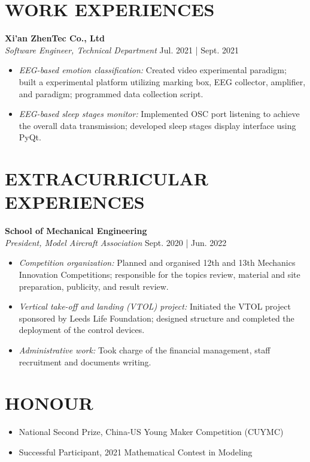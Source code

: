 \documentclass[a4paper,9pt]{extarticle}
\begin{document}
\section*{WORK EXPERIENCES}
\noindent
\textbf{Xi'an ZhenTec Co., Ltd} \\ %
\textit{Software Engineer, Technical Department} \hfill Jul. 2021 | Sept. 2021 %
\begin{itemize}
    \item \textit{EEG-based emotion classification:} Created video experimental paradigm; built a experimental platform utilizing marking box, EEG collector, amplifier, and paradigm; programmed data collection script.
    \item \textit{EEG-based sleep stages monitor:} Implemented OSC port listening to achieve the overall data transmission; developed sleep stages display interface using PyQt.
\end{itemize}

\section*{EXTRACURRICULAR EXPERIENCES}
\noindent
\textbf{School of Mechanical Engineering} \\ %
\textit{President, Model Aircraft Association} \hfill Sept. 2020 | Jun. 2022 %
\begin{itemize}
    \item \textit{Competition organization:} Planned and organised 12th and 13th Mechanics Innovation Competitions; responsible for the topics review, material and site preparation, publicity, and result review.
    \item \textit{Vertical take-off and landing (VTOL) project:} Initiated the VTOL project sponsored by Leeds Life Foundation; designed structure and completed the deployment of the control devices.
    \item \textit{Administrative work:} Took charge of the financial management, staff recruitment and documents writing.
\end{itemize}

\section*{HONOUR}
\begin{itemize}
    \item National Second Prize, China-US Young Maker Competition (CUYMC)
    \item Successful Participant, 2021 Mathematical Contest in Modeling
\end{itemize}
\end{document}
